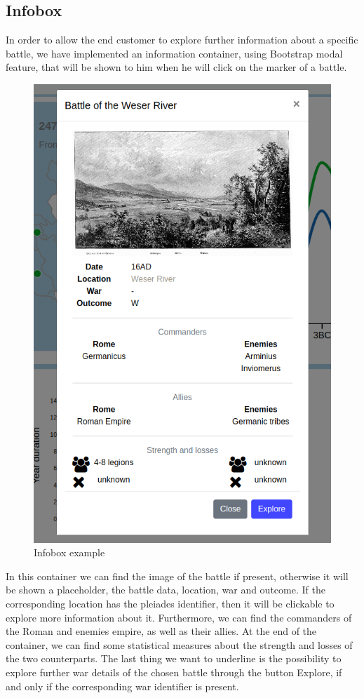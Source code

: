 \subsection{Infobox}
In order to allow the end customer to explore further information about a specific battle, we have implemented an information container, using Bootstrap modal feature, that will be shown to him when he will click on the marker of a battle. 
\begin{figure}[H]
	\centering
	\includegraphics[scale=0.20]{./images/infobox.png}
	\caption{Infobox example}
\end{figure}
In this container we can find the image of the battle if present, otherwise it will be shown a placeholder, the battle data, location, war and outcome. If the corresponding location has the pleiades identifier, then it will be clickable to explore more information about it. Furthermore, we can find the commanders of the Roman and enemies empire, as well as their allies. At the end of the container, we can find some statistical measures about the strength and losses of the two counterparts. The last thing we want to underline is the possibility to explore further war details of the chosen battle through the button Explore, if and only if the corresponding war identifier is present.
